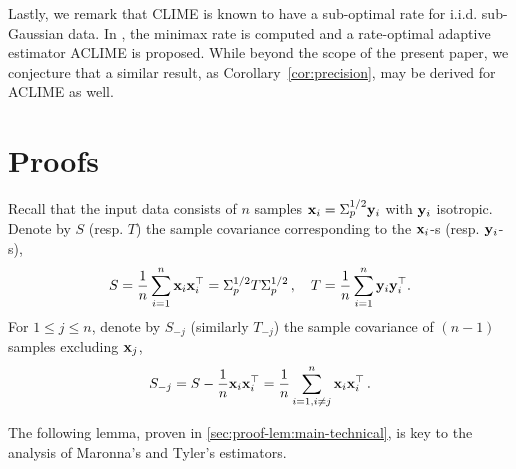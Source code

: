 \documentclass[times,sort&compress,3p]{elsarticle}
\begin{document}
Lastly, we remark that CLIME is known to have a sub-optimal rate for i.i.d. sub-Gaussian data. In \cite{cai2016estimating}, the minimax rate is computed and a rate-optimal adaptive estimator ACLIME is proposed. 
While beyond the scope of the present paper, we conjecture that 
a similar result, as Corollary~\ref{cor:precision}, may be derived for ACLIME as well. 

\section{Proofs}
\label{sec:proofs}

Recall that the input data consists of $n$ samples ${\bf x}_i=\Sigma_p^{1/2}{\bf y}_i$ with ${\bf y}_i$ isotropic. Denote by $S$ (resp. $T$) the sample covariance corresponding to the ${\bf x}_i$-s (resp. ${\bf y}_i$-s),
\[
S = \frac{1}{n}\sum_{i=1}^{n} {\bf x}_i {\bf x}_i^\top = \Sigma_p^{1/2} T \Sigma_p^{1/2} \,,\quad T = \frac1n \sum_{i=1}^n {\bf y}_i {\bf y}_i^\top .
\]
For $1\le j \le n$, denote by $S_{-j}$ (similarly $T_{-j}$) the sample covariance of $(n-1)$ samples excluding ${\bf x}_j$,
\[
S_{-j} = S - \frac1n {\bf x}_i{\bf x}_i^\top = \frac1n \sum_{i=1,i\ne j}^n {\bf x}_i {\bf x}_i^\top \,.
\]
     
The following lemma, proven in \ref{sec:proof-lem:main-technical}, is key to the analysis
of Maronna's and Tyler's estimators. 
  
\end{document}
